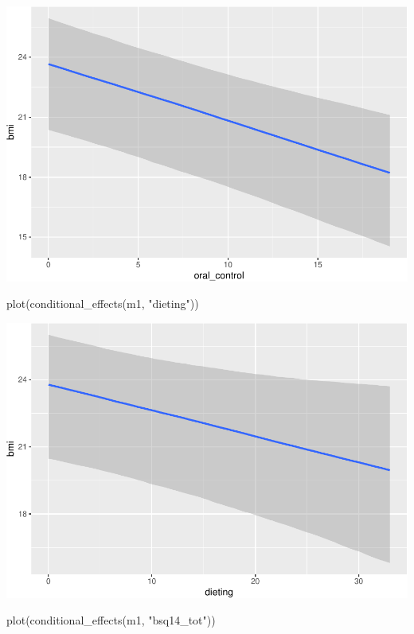 \documentclass[
]{article}
\newenvironment{Shaded}{\begin{snugshade}}{\end{snugshade}}
\newcommand{\FunctionTok}[1]{\textcolor[rgb]{0.00,0.00,0.00}{#1}}
\newcommand{\NormalTok}[1]{#1}
\newcommand{\StringTok}[1]{\textcolor[rgb]{0.31,0.60,0.02}{#1}}
\begin{document}
\includegraphics{050_quest_groups_files/figure-latex/unnamed-chunk-1-2.pdf}

\begin{Shaded}
\begin{Highlighting}[]
\FunctionTok{plot}\NormalTok{(}\FunctionTok{conditional\_effects}\NormalTok{(m1, }\StringTok{"dieting"}\NormalTok{))}
\end{Highlighting}
\end{Shaded}

\includegraphics{050_quest_groups_files/figure-latex/unnamed-chunk-1-3.pdf}

\begin{Shaded}
\begin{Highlighting}[]
\FunctionTok{plot}\NormalTok{(}\FunctionTok{conditional\_effects}\NormalTok{(m1, }\StringTok{"bsq14\_tot"}\NormalTok{))}
\end{Highlighting}
\end{Shaded}
\end{document}
